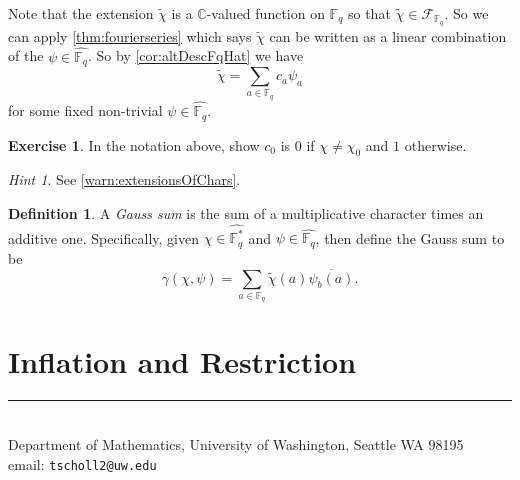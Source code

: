 \documentclass[11pt]{article}
\makeatletter
\newcommand{\BB}[1]{\mathbb{#1}} %
\newcommand{\script}[1]{\mathcal{#1}} %
\newcommand{\CC}{\BB{C}}
\newcommand{\FF}{\BB{F}}
\newcommand{\sF}{\script{F}}
\renewcommand{\hat}{\widehat}
\theoremstyle{plain}
\theoremstyle{definition}
\newtheorem{defn}[definitioncounter]{Definition}
\newtheorem{excer}[exercisecounter]{Exercise}
\theoremstyle{remark}
\newtheorem*{hint}{Hint}
\newcommand{\myauthor}{Travis Scholl}
\newcommand{\myemail}{tscholl2@uw.edu}
\makeatother
\begin{document}
Note that the extension $\widetilde{\chi}$ is a $\CC$-valued function on $\FF_q$ so that $\widetilde{\chi}\in\sF_{\FF_q}$. So we can apply \autoref{thm:fourierseries} which says $\widetilde{\chi}$ can be written as a linear combination of the $\psi\in\hat{\FF_q}$. So by \autoref{cor:altDescFqHat} we have
$$
\widetilde{\chi} = \sum_{a\in\FF_q}c_a\psi_a
$$
for some fixed non-trivial $\psi\in\hat{\FF_q}$.

\begin{excer}
	In the notation above, show $c_0$ is $0$ if $\chi\neq\chi_0$ and $1$ otherwise.
	\begin{hint}
		See \autoref{warn:extensionsOfChars}.
	\end{hint}
\end{excer}

\begin{defn}
	A \emph{Gauss sum} is the sum of a multiplicative character times an additive one. Specifically, given $\chi\in\hat{\FF_q^*}$ and $\psi\in\hat{\FF_q}$, then define the Gauss sum to be
	$$
	\gamma(\chi,\psi) = \sum_{a\in\FF_q}\widetilde{\chi}(a)\overline{\psi_b(a)}.
	$$
\end{defn}





\section{Inflation and Restriction}



\begin{center}
\noindent\rule{4cm}{.5pt}
\vspace{.25cm}

\noindent {\sc \small \myauthor}\\
{\small Department of Mathematics, University of Washington, Seattle WA 98195} \\
email: {\tt \myemail}
\end{center}
\end{document}
